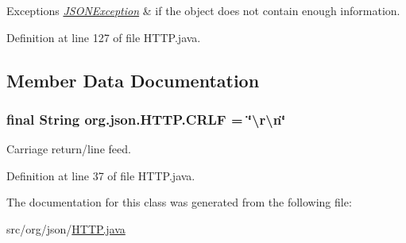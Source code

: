 \begin{DoxyExceptions}{Exceptions}
{\em \hyperlink{classorg_1_1json_1_1JSONException}{J\-S\-O\-N\-Exception}} & if the object does not contain enough information. \\
\hline
\end{DoxyExceptions}


Definition at line 127 of file H\-T\-T\-P.\-java.



\subsection{Member Data Documentation}
\hypertarget{classorg_1_1json_1_1HTTP_a7feb3304ccde0415ee29b8f997fb65b6}{
\subsubsection[{C\-R\-L\-F}]{\setlength{\rightskip}{0pt plus 5cm}final String org.\-json.\-H\-T\-T\-P.\-C\-R\-L\-F = \char`\"{}\textbackslash{}r\textbackslash{}n\char`\"{}\hspace{0.3cm}{\ttfamily [static]}}}\label{classorg_1_1json_1_1HTTP_a7feb3304ccde0415ee29b8f997fb65b6}
Carriage return/line feed. 

Definition at line 37 of file H\-T\-T\-P.\-java.



The documentation for this class was generated from the following file\-:\begin{DoxyCompactItemize}
\item 
src/org/json/\hyperlink{HTTP_8java}{H\-T\-T\-P.\-java}\end{DoxyCompactItemize}
